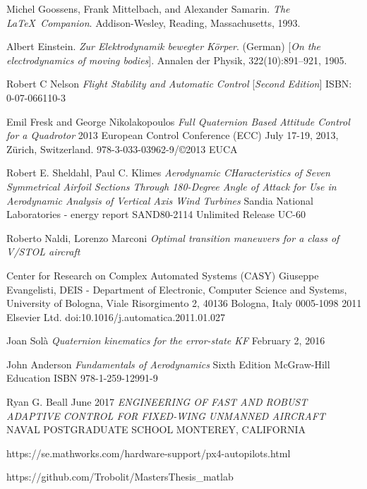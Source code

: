 \documentclass{article}
\begin{document}
\begin{thebibliography}{9}
Michel Goossens, Frank Mittelbach, and Alexander Samarin. 
\textit{The \LaTeX\ Companion}. 
Addison-Wesley, Reading, Massachusetts, 1993.

Albert Einstein. 
\textit{Zur Elektrodynamik bewegter K{\"o}rper}. (German) 
[\textit{On the electrodynamics of moving bodies}]. 
Annalen der Physik, 322(10):891–921, 1905.

Robert C Nelson
\textit{Flight Stability and Automatic Control}
[\textit{Second Edition}]
ISBN: 0-07-066110-3

Emil Fresk and George Nikolakopoulos
\textit{Full Quaternion Based Attitude Control for a Quadrotor}
2013 European Control Conference (ECC)
July 17-19, 2013, Zürich, Switzerland.
978-3-033-03962-9/©2013 EUCA

Robert E. Sheldahl, Paul C. Klimes
\textit{Aerodynamic CHaracteristics of Seven Symmetrical Airfoil Sections Through 180-Degree Angle of Attack for Use in Aerodynamic Analysis of Vertical Axis Wind Turbines}
Sandia National Laboratories - energy report
SAND80-2114 Unlimited Release UC-60

Roberto Naldi, Lorenzo Marconi
\textit{Optimal transition maneuvers for a class of V/STOL aircraft}

Center for Research on Complex Automated Systems (CASY) Giuseppe Evangelisti, DEIS - Department of Electronic, Computer Science and Systems, University of Bologna, Viale
Risorgimento 2, 40136 Bologna, Italy
0005-1098 
2011 Elsevier Ltd.
doi:10.1016/j.automatica.2011.01.027

Joan Sol\`{a}
\textit{Quaternion kinematics for the error-state KF}
February 2, 2016

John Anderson
\textit{Fundamentals of Aerodynamics}
Sixth Edition
McGraw-Hill Education
ISBN 978-1-259-12991-9

Ryan G. Beall
June 2017
\textit{ENGINEERING OF FAST AND ROBUST ADAPTIVE
CONTROL FOR FIXED-WING UNMANNED AIRCRAFT}
NAVAL POSTGRADUATE SCHOOL MONTEREY, CALIFORNIA

https://se.mathworks.com/hardware-support/px4-autopilots.html

https://github.com/Trobolit/MastersThesis\_matlab

\end{thebibliography}
\end{document}
